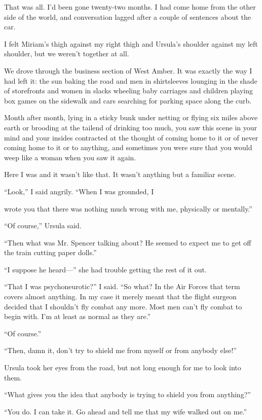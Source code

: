 \documentclass{novel}
\begin{document}
That was all. I’d been gone twenty-two months. I had come home from the other side of the world, and conversation lagged after a couple of sentences about the car.

I felt Miriam’s thigh against my right thigh and Ursula’s shoulder against my left shoulder, but we weren’t together at all.

We drove through the business section of West Amber. It was exactly the way I had left it: the sun baking the road and men in shirtsleeves lounging in the shade of storefronts and women in slacks wheeling baby carriages and children playing box games on the sidewalk and cars searching for parking space along the curb. 

Month after month, lying in a sticky bunk under netting or flying six miles above earth or brooding at the tailend of drinking too much, you saw this scene in your mind and your insides contracted at the thought of coming home to it or of never coming home to it or to anything, and sometimes you were sure that you would weep like a woman when you saw it again.

Here I was and it wasn’t like that. It wasn’t anything but a familiar scene.

“Look,” I said angrily. “When I was grounded, I

\noindent wrote you that there was nothing much wrong with me, physically or mentally.”

“Of course,” Ursula said.

“Then what was Mr. Spencer talking about? He seemed to expect me to get off the train cutting paper dolls.”

“I suppose he heard—” she had trouble getting the rest of it out.

“That I was psychoneurotic?” I said. “So what? In the Air Forces that term covers almost anything. In my case it merely meant that the flight surgeon decided that I shouldn’t fly combat any more. Most men can’t fly combat to begin with. I’m at least as normal as they are.”

“Of course.”

“Then, damn it, don’t try to shield me from myself or from anybody else!”

Ursula took her eyes from the road, but not long enough for me to look into them. 

“What gives you the idea that anybody is trying to shield you from anything?”

“You do. I can take it. Go ahead and tell me that my wife walked out on me.”
\end{document}
